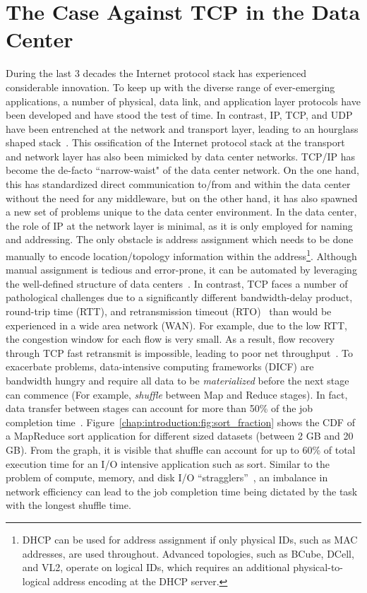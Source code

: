 \documentclass[a4paper,12pt,twoside,openright]{report}
\begin{document}
\section{The Case Against TCP in the Data Center}
During the last 3 decades the Internet protocol stack has experienced
considerable innovation. To keep up with the diverse range of ever-emerging
applications, a number of physical, data link, and application layer protocols
have been developed and have stood the test of time. In contrast, IP, TCP, and
UDP have been entrenched at the network and transport layer, leading to an
hourglass shaped stack~\cite{Akhshabi:2011:ELP}. This ossification of the
Internet protocol stack at the transport and network layer has also been
mimicked by data center networks. TCP/IP has become the de-facto ``narrow-waist"
of the data center network. On the one hand, this has standardized direct
communication to/from and within the data center without the need for any
middleware, but on the other hand, it has also spawned a new set of problems
unique to the data center environment. In the data center, the role of IP at the
network layer is minimal, as it is only employed for naming and addressing. The
only obstacle is address assignment which needs to be done manually to encode
location/topology information within the address\footnote{DHCP can be used for
address assignment if only physical IDs, such as MAC addresses, are used
throughout. Advanced topologies, such as BCube, DCell, and VL2, operate on
logical IDs, which requires an additional physical-to-logical address encoding
at the DHCP server.}. Although manual assignment is tedious and error-prone, it
can be automated by leveraging the well-defined structure of data
centers~\cite{Chen:2010:GAA}. In contrast, TCP faces a number of pathological
challenges due to a significantly different bandwidth-delay product, round-trip
time (RTT), and retransmission timeout (RTO)~\cite{Chen:2009:UTI} than would be
experienced in a wide area network (WAN). For example, due to the low RTT, the
congestion window for each flow is very small. As a result, flow recovery
through TCP fast retransmit is impossible, leading to poor net
throughput~\cite{Kandula:2009:NDC}. To exacerbate problems, data-intensive
computing frameworks (DICF) are bandwidth hungry and require all data to be
\emph{materialized} before the next stage can commence (For example,
\emph{shuffle} between Map and Reduce stages). In fact, data transfer between
stages can account for more than 50\% of the job completion
time~\cite{Chowdhury:2011:MDT}.
Figure~\ref{chap:introduction:fig:sort_fraction} shows the CDF of a MapReduce
sort application for different sized datasets (between 2 GB and 20 GB). From the
graph, it is visible that shuffle can account for up to 60\% of total execution
time for an I/O intensive application such as sort. Similar to the problem of
compute, memory, and disk I/O ``stragglers''~\cite{Zaharia:2008:IMP}, an
imbalance in network efficiency can lead to the job completion time being
dictated by the task with the longest shuffle time.
\end{document}
